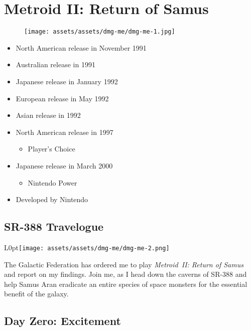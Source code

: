 \documentclass{book}
\begin{document}
\chapter*{Metroid II: Return of Samus}
\vspace{\baselineskip}\begin{figure}[H]{\texttt{[image: assets/assets/dmg-me/dmg-me-1.jpg]}}\end{figure}\vspace{\baselineskip}
\begin{itemize}[left=0pt, nosep]
\item North American release in November 1991
\item Australian release in 1991
\item Japanese release in January 1992
\item European release in May 1992
\item Asian release in 1992
\item North American release in 1997
\begin{itemize}
\item Player’s Choice
\end{itemize}
\item Japanese release in March 2000
\begin{itemize}
\item Nintendo Power
\end{itemize}
\item Developed by Nintendo

\end{itemize}
\newpage\FloatBarrier\section*{SR-388 Travelogue}
\begin{wrapfigure}{L}{0pt}{\texttt{[image: assets/assets/dmg-me/dmg-me-2.png]}}\end{wrapfigure}\noindent
The Galactic Federation has ordered me to play \emph{Metroid~II: Return of Samus} and report on my findings. Join me, as I head down the caverns of SR-388 and help Samus Aran eradicate an entire species of space monsters for the essential benefit of the galaxy.\par
\FloatBarrier\section*{Day Zero: Excitement}
\end{document}
